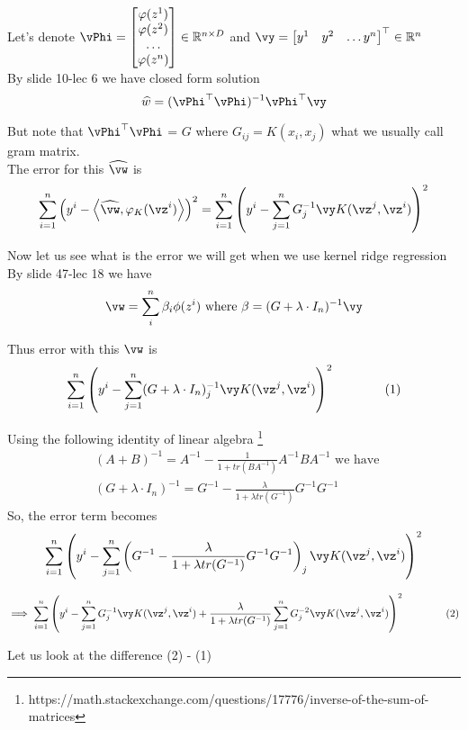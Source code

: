 \documentclass[a4paper,11pt]{article}
\begin{document}
\begin{mlsolution}
Let's denote $\vPhi  = \begin{bmatrix}
    \varphi(z^1)\\
    \varphi(z^2)\\
    \ldots\\
     \varphi(z^n) \\
\end{bmatrix} \in \mathbb{R}^{n\times D}$ and $\vy  = \begin{bmatrix} 
    y^1 & y^2 & \ldots y^n \\
\end{bmatrix}^\top \in \mathbb{R}^n$
\\
By slide 10-lec 6 we have closed form solution
$$\widehat{w} = (\vPhi^\top \vPhi )^{-1}\vPhi^\top \vy $$

But note that $\vPhi^\top\vPhi$ = $G$ where $G_{ij} = K(x_i, x_j)$ what we usually call gram matrix.\\
The error for this $\widehat{\vw}$ is 
$$\sum_{i=1}^n\left(y^i - \ip{\widehat{\vw}}{\varphi_K(\vz^i)}\right)^2=\sum_{i=1}^n\left(y^i - \sum_{j=1}^n G_j^{-1}\vy K(\vz^j, \vz^i)\right)^2 $$

Now let us see what is the error we will get when we use kernel ridge regression\\
By slide 47-lec 18 we have 
$$\vw = \sum_i^n \beta_i \phi(z^i) \text{ where } \beta = (G + \lambda\cdot I_n)^{-1}\vy$$

Thus error with this $\vw$ is 
$$ \sum_{i=1}^n\left(y^i - \sum_{j=1}^n (G + \lambda\cdot I_n)_j^{-1}\vy K(\vz^j, \vz^i)\right)^2 \qquad\qquad{(1)}$$

Using the following identity of linear algebra \footnote{https://math.stackexchange.com/questions/17776/inverse-of-the-sum-of-matrices}
\begin{align*}
& (A+B)^{-1} = A^{-1} - \frac{1}{1+tr(BA^{-1})} A^{-1}BA^{-1} \text{ we have }\\
& (G + \lambda\cdot I_n)^{-1} = G^{-1} - \frac{\lambda}{1+\lambda tr(G^{-1})} G^{-1}G^{-1}
\end{align*}
So, the error term becomes 
$$ \sum_{i=1}^n\left(y^i - \sum_{j=1}^n \left(G^{-1} - \frac{\lambda}{1+\lambda tr(G^{-1})} G^{-1}G^{-1}\right)_j \vy K(\vz^j, \vz^i)\right)^2 $$

$$ \implies \sum_{i=1}^n\left(y^i - \sum_{j=1}^n G^{-1}_j \vy K(\vz^j, \vz^i) + \frac{\lambda}{1+\lambda tr(G^{-1})} \sum_{j=1}^n  G^{-2}_j \vy K(\vz^j, \vz^i) \right)^2  \qquad\qquad{(2)}$$

Let us look at the difference (2) - (1)


\end{mlsolution}
\end{document}
